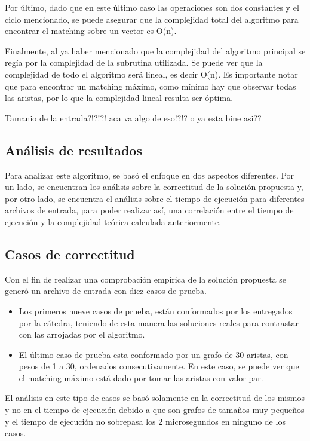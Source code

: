 \documentclass[a4paper, 12pt]{article}
\begin{document}
Por último, dado que en este último caso las operaciones son dos constantes y el ciclo mencionado, se puede asegurar que la complejidad total del algoritmo para encontrar el matching sobre un vector es O(n).

Finalmente, al ya haber mencionado que la complejidad del algoritmo principal se regía por la complejidad de la subrutina utilizada. Se puede ver que la complejidad de todo el algoritmo será lineal, es decir O(n). Es importante notar que para encontrar un matching máximo, como mínimo hay que observar todas las aristas, por lo que la complejidad lineal resulta ser óptima.

Tamanio de la entrada?!?!?! aca va algo de eso!?!? o ya esta bine asi??


\subsection*{Análisis de resultados}

Para analizar este algoritmo, se basó el enfoque en dos aspectos diferentes. Por un lado, se encuentran los análisis sobre la correctitud de la solución propuesta y, por otro lado, se encuentra el análisis sobre el tiempo de ejecución para diferentes archivos de entrada, para poder realizar así, una correlación entre el tiempo de ejecución y la complejidad teórica calculada anteriormente.

\subsection*{Casos de correctitud}
Con el fin de realizar una comprobación empírica de la solución propuesta se generó un archivo de entrada con diez casos de prueba.
\begin{itemize}
\item Los primeros nueve casos de prueba, están conformados por los entregados por la cátedra, teniendo de esta manera las soluciones reales para contrastar con las arrojadas por el algoritmo.
\item El último caso de prueba esta conformado por un grafo de 30 aristas, con pesos de 1 a 30, ordenados consecutivamente. En este caso, se puede ver que el matching máximo está dado por tomar las aristas con valor par.
\end{itemize}

El análisis en este tipo de casos se basó solamente en la correctitud de los mismos y no en el tiempo de ejecución debido a que son grafos de tama\~{n}os muy peque\~{n}os y el tiempo de ejecución no sobrepasa los 2 microsegundos en ninguno de los casos.
\end{document}
